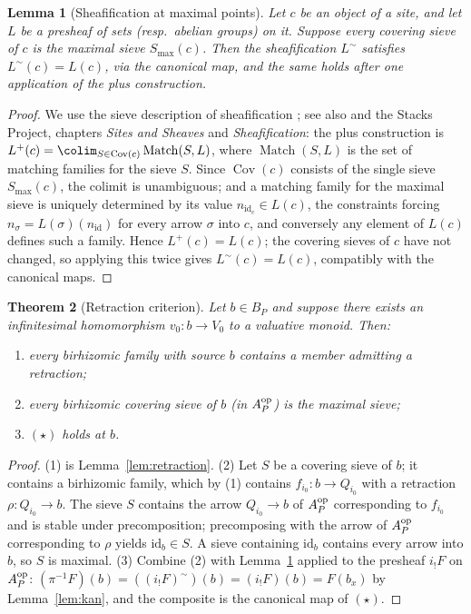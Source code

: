 \documentclass[11pt]{amsart}
\theoremstyle{plain}
\newtheorem{theorem}{Theorem}[section]
\newtheorem{lemma}[theorem]{Lemma}
\theoremstyle{remark}
\theoremstyle{definition}
\numberwithin{equation}{section}
\begin{document}
\begin{lemma}[Sheafification at maximal points]\label{lem:maximal}
Let $c$ be an object of a site, and let $L$ be a presheaf of sets
(resp.\ abelian groups) on it.  Suppose every covering sieve of $c$ is
the maximal sieve $S_{\max}(c)$.  Then the sheafification
$L^{\sim}$ satisfies $L^{\sim}(c)=L(c)$, via the canonical map, and the
same holds after one application of the plus construction.
\end{lemma}
\begin{proof}
We use the sieve description of sheafification
\cite[Exp.~II]{SGA4}; see also \cite{MM} and the Stacks Project,
chapters \emph{Sites and Sheaves} and \emph{Sheafification}: the plus
construction is $L^{+}(c)=\colim_{S\in\operatorname{Cov}(c)}
\operatorname{Match}(S,L)$, where $\operatorname{Match}(S,L)$ is the set of
matching families for the sieve $S$.  Since $\operatorname{Cov}(c)$ consists
of the single sieve $S_{\max}(c)$, the colimit is unambiguous; and a
matching family for the maximal sieve is uniquely determined by its value
$n_{\mathrm{id}_c}\in L(c)$, the constraints forcing
$n_\sigma=L(\sigma)(n_{\mathrm{id}})$ for every arrow $\sigma$ into $c$,
and conversely any element of $L(c)$ defines such a family.  Hence
$L^+(c)=L(c)$; the covering sieves of $c$ have not changed, so applying
this twice gives $L^{\sim}(c)=L(c)$, compatibly with the canonical maps.
\end{proof}

\begin{theorem}[Retraction criterion]\label{thm:retraction}
Let $b\in B_P$ and suppose there exists an infinitesimal homomorphism
$v_0\colon b\to V_0$ to a valuative monoid.  Then:
\begin{enumerate}
\item every birhizomic family with source $b$ contains a member admitting
a retraction;
\item every birhizomic covering sieve of $b$ (in $A_P^{\rm op}$) is the
maximal sieve;
\item $(\star)$ holds at $b$.
\end{enumerate}
\end{theorem}
\begin{proof}
(1) is Lemma~\ref{lem:retraction}.  (2) Let $S$ be a covering sieve of
$b$; it contains a birhizomic family, which by (1) contains
$f_{i_0}\colon b\to Q_{i_0}$ with a retraction
$\rho\colon Q_{i_0}\to b$.  The sieve $S$ contains the arrow
$Q_{i_0}\to b$ of $A_P^{\rm op}$ corresponding to $f_{i_0}$ and is stable
under precomposition; precomposing with the arrow of $A_P^{\rm op}$
corresponding to $\rho$ yields $\mathrm{id}_b\in S$.  A sieve containing
$\mathrm{id}_b$ contains every arrow into $b$, so $S$ is maximal.
(3) Combine (2) with Lemma~\ref{lem:maximal} applied to the presheaf
$i_!F$ on $A_P^{\rm op}$: $(\pi^{-1}F)(b)=((i_!F)^{\sim})(b)=(i_!F)(b)
=F(b_x)$ by Lemma~\ref{lem:kan}, and the composite is the canonical map
of $(\star)$.
\end{proof}
\end{document}

